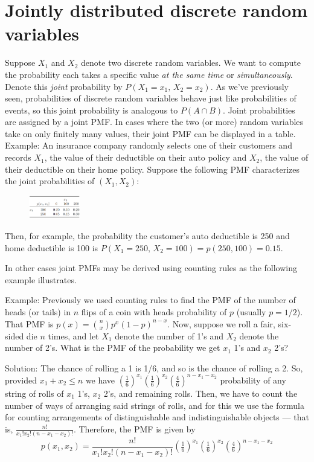 \documentclass[]{book}
\begin{document}
\section{Jointly distributed discrete random
variables}\label{jointly-distributed-discrete-random-variables}

Suppose \(X_1\) and \(X_2\) denote two discrete random variables. We
want to compute the probability each takes a specific value \emph{at the
same time} or \emph{simultaneously}. Denote this \emph{joint}
probability by \(P(X_1 = x_1, \, X_2 = x_2)\). As we've previously seen,
probabilities of discrete random variables behave just like
probabilities of events, so this joint probability is analogous to
\(P(A\cap B)\). Joint probabilities are assigned by a joint PMF. In
cases where the two (or more) random variables take on only finitely
many values, their joint PMF can be displayed in a table. Example: An
insurance company randomly selects one of their customers and records
\(X_1\), the value of their deductible on their auto policy and \(X_2\),
the value of their deductible on their home policy. Suppose the
following PMF characterizes the joint probabilities of \((X_1, X_2)\):

\begin{figure}[htbp]
\centering
\includegraphics[width=0.20000\textwidth]{joint_pmf.PNG}
\caption{}
\end{figure}

Then, for example, the probability the customer's auto deductible is 250
and home deductible is 100 is
\(P(X_1 = 250, \, X_2 = 100) = p(250,100) = 0.15\).

In other cases joint PMFs may be derived using counting rules as the
following example illustrates.

Example: Previously we used counting rules to find the PMF of the number
of heads (or tails) in \(n\) flips of a coin with heads probability of
\(p\) (usually \(p=1/2\)). That PMF is
\(p(x) = {n \choose x}p^x (1-p)^{n-x}\). Now, suppose we roll a fair,
six-sided die \(n\) times, and let \(X_1\) denote the number of 1's and
\(X_2\) denote the number of 2's. What is the PMF of the probability we
get \(x_1\) 1's and \(x_2\) 2's?

Solution: The chance of rolling a 1 is 1/6, and so is the chance of
rolling a 2. So, provided \(x_1 + x_2 \leq n\) we have
\((\tfrac16)^{x_1}(\tfrac16)^{x_2}(\tfrac46)^{n-x_1-x_2}\) probability
of any string of rolls of \(x_1\) 1's, \(x_2\) 2's, and remaining rolls.
Then, we have to count the number of ways of arranging said strings of
rolls, and for this we use the formula for counting arrangements of
distinguishable and indistinguishable objects --- that is,
\(\frac{n!}{x_1! x_2! (n-x_1 -x_2)!}\). Therefore, the PMF is given by
\[p(x_1, x_2) = \frac{n!}{x_1! x_2! (n-x_1 -x_2)!}(\tfrac16)^{x_1}(\tfrac16)^{x_2}(\tfrac46)^{n-x_1-x_2}\]
\end{document}
